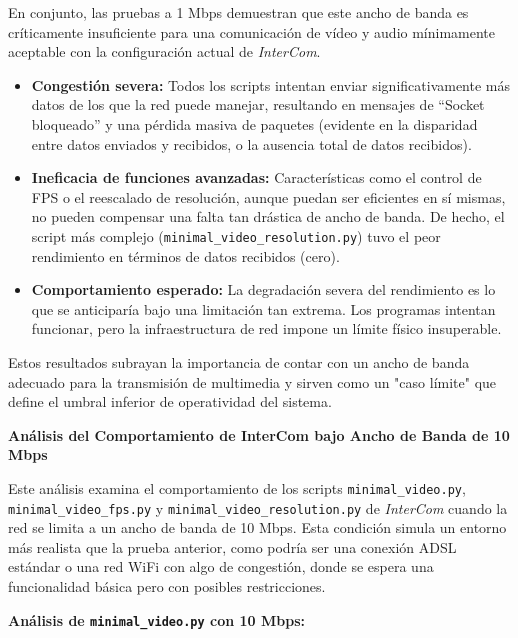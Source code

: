 En conjunto, las pruebas a 1 Mbps demuestran que este ancho de banda es críticamente insuficiente para una comunicación de vídeo y audio mínimamente aceptable con la configuración actual de \textit{InterCom}.
\begin{itemize}
    \item \textbf{Congestión severa:} Todos los scripts intentan enviar significativamente más datos de los que la red puede manejar, resultando en mensajes de ``Socket bloqueado'' y una pérdida masiva de paquetes (evidente en la disparidad entre datos enviados y recibidos, o la ausencia total de datos recibidos).
    \item \textbf{Ineficacia de funciones avanzadas:} Características como el control de FPS o el reescalado de resolución, aunque puedan ser eficientes en sí mismas, no pueden compensar una falta tan drástica de ancho de banda. De hecho, el script más complejo (\texttt{minimal\_video\_resolution.py}) tuvo el peor rendimiento en términos de datos recibidos (cero).
    \item \textbf{Comportamiento esperado:} La degradación severa del rendimiento es lo que se anticiparía bajo una limitación tan extrema. Los programas intentan funcionar, pero la infraestructura de red impone un límite físico insuperable.
\end{itemize}
Estos resultados subrayan la importancia de contar con un ancho de banda adecuado para la transmisión de multimedia y sirven como un "caso límite" que define el umbral inferior de operatividad del sistema.

\begin{center}
    \Large \textbf{Análisis del Comportamiento de InterCom bajo Ancho de Banda de 10 Mbps}
\end{center}
\vspace{\baselineskip}

Este análisis examina el comportamiento de los scripts \texttt{minimal\_video.py}, \texttt{minimal\_video\_fps.py} y \texttt{minimal\_video\_resolution.py} de \textit{InterCom} cuando la red se limita a un ancho de banda de 10 Mbps. Esta condición simula un entorno más realista que la prueba anterior, como podría ser una conexión ADSL estándar o una red WiFi con algo de congestión, donde se espera una funcionalidad básica pero con posibles restricciones.

\vspace{\baselineskip}

\textbf{Análisis de \texttt{minimal\_video.py} con 10 Mbps:}

